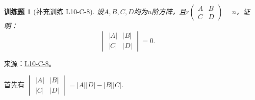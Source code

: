 \documentclass[12pt,fontset=fandol]{ctexart}
\newtheorem{exercise}{训练题}[section]
\begin{document}
\begin{exercise}[补充训练 L10-C-8]\label{prob:L10-C-8}
设$A,B,C,D$均为$n$阶方阵，且$r\begin{pmatrix}
                A & B \\ C & D
            \end{pmatrix}=n$，证明：
        \[\begin{vmatrix}
                |A| & |B| \\ |C| & |D|
            \end{vmatrix} = 0.\]
\end{exercise}
\noindent 来源：\href{https://github.com/yhwu-is/Linear-Algebra-Left-Undone/blob/new/%E8%AE%B2%E4%B9%89/%E4%B8%93%E9%A2%98/10%20%E8%A1%8C%E5%88%97%E5%BC%8F.tex}{L10-C-8}。
\begin{solve}
首先有 $\begin{vmatrix}
                \lvert A \rvert & \lvert B \rvert \\
                \lvert C \rvert & \lvert D \rvert
            \end{vmatrix} = \lvert A \rvert \lvert D \rvert-\lvert B \rvert \lvert C \rvert$.
\end{solve}
\end{document}
